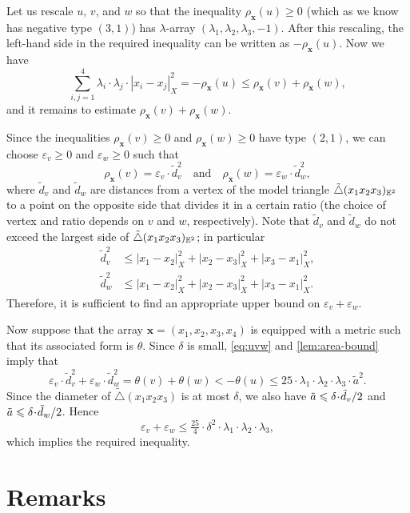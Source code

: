 Let us rescale $u$, $v$, and $w$ so that the inequality $\rho_{\bm{x}}(u)\geqslant 0$ (which as we know has negative type $(3,1)$)
has $\lambda$-array $(\lambda_1,\lambda_2,\lambda_3,-1)$.
After this rescaling, the left-hand side in the required inequality can be written as $-\rho_{\bm{x}}(u)$.
Now we have
\[\sum_{i,j=1}^4\lambda_i\cdot\lambda_j\cdot|x_i-x_j|_X^2=-\rho_{\bm{x}}(u)\leqslant \rho_{\bm{x}}(v)+\rho_{\bm{x}}(w),\]
and it remains to estimate $\rho_{\bm{x}}(v)+\rho_{\bm{x}}(w)$.

Since the inequalities $\rho_{\bm{x}}(v)\geqslant 0$ and $\rho_{\bm{x}}(w)\geqslant 0$ have type $(2,1)$, we can choose $\varepsilon_v\geqslant 0$ and $\varepsilon_w\geqslant 0$ such that
\[\rho_{\bm{x}}(v)=\varepsilon_v\cdot \tilde d_v^2
\quad\text{and}\quad
 \rho_{\bm{x}}(w)=\varepsilon_w\cdot \tilde d_w^2,
\]
where
$\tilde d_v$ and $\tilde d_w$ are distances from a vertex of the model triangle $\tilde\triangle(x_1x_2x_3)_{\mathbb{E}^2}$ to a point on the opposite side that divides it in a certain ratio (the choice of vertex and ratio depends on $v$ and $w$, respectively).
Note that $\tilde d_v$ and $\tilde d_w$ do not exceed the largest side of $\tilde\triangle(x_1x_2x_3)_{\mathbb{E}^2}$; in particular
\begin{align*}
\tilde d_v^2&\leqslant |x_1-x_2|_X^2+|x_2-x_3|_X^2+|x_3-x_1|_X^2,
\\
\tilde d_w^2&\leqslant |x_1-x_2|_X^2+|x_2-x_3|_X^2+|x_3-x_1|_X^2.
\end{align*}
Therefore, it is sufficient to find an appropriate upper bound on $\varepsilon_v+\varepsilon_w$.

Now suppose that the array $\bm{x}=(x_1,x_2,x_3,x_4)$ is equipped with a metric such that its associated form is $\theta$.
Since $\delta$ is small, \ref{eq:uvw} and \ref{lem:area-bound} imply that
\[\varepsilon_v\cdot \tilde d_v^2+\varepsilon_w\cdot \tilde d_w^2=\theta(v)+\theta(w)
<
-\theta(u)
\leqslant
25\cdot\lambda_1\cdot\lambda_2\cdot\lambda_3\cdot\tilde a^2.\]
Since the diameter of $\tilde\triangle(x_1x_2x_3)$ is at most $\delta$, we also have
$\tilde a\z\leqslant \delta\cdot \tilde d_v/2$ and
$\tilde a\z\leqslant \delta\cdot \tilde d_w/2$.
Hence
\[\varepsilon_v+\varepsilon_w\leqslant \tfrac{25}4\cdot \delta^2\cdot\lambda_1\cdot\lambda_2\cdot\lambda_3,\]
which implies the required inequality.
\qeds

\section{Remarks}

